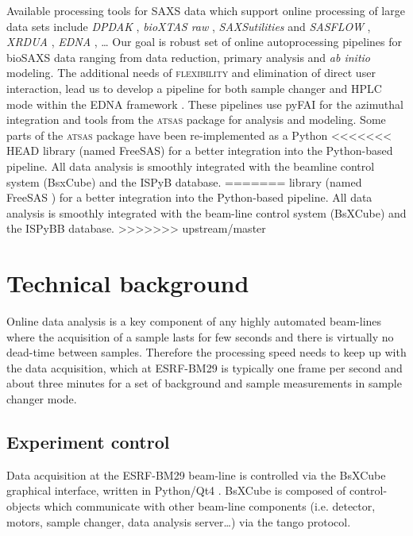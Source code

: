\documentclass[preprint,pdf]{iucr}              %
\begin{document}
Available processing tools for SAXS data which support online processing of
large data sets include \textit{DPDAK} \cite{DPDAK}, \textit{bioXTAS raw}
\cite{BioXTASraw}, \textit{SAXSutilities} \cite{SAXSUtilities} and
\textit{SASFLOW} \cite{X33P,P12},  \textit{XRDUA} \cite{XRDUA}, \textit{EDNA}
, \ldots 
Our goal is robust set of online autoprocessing pipelines
for bioSAXS data ranging from data reduction, primary analysis and \textit{ab
initio} modeling.
The additional needs of \textsc{flexibility} and elimination of
direct user interaction, lead us to develop a pipeline for both sample changer and HPLC mode within the
EDNA framework \cite{edna}.
These pipelines use pyFAI for the azimuthal integration \cite{pyFAI} and tools
from the \textsc{atsas} package \cite{ATSAS1, ATSAS2} for analysis and modeling.
Some parts of the \textsc{atsas} package have been re-implemented as a Python
<<<<<<< HEAD
library (named FreeSAS) for a better integration into the Python-based pipeline. 
All data analysis is smoothly integrated with the beamline control system
(BsxCube) and the ISPyB database.
=======
library (named FreeSAS \cite{freesas}) for a better integration into the
Python-based pipeline.
All data analysis is smoothly integrated with the beam-line control system
(BsXCube) and the ISPyBB \cite{ISPYBB} database.
>>>>>>> upstream/master

\section{Technical background}

Online data analysis is a key component of any highly automated beam-lines
where the acquisition of a sample lasts for few seconds and there is
virtually no dead-time between samples.
Therefore the processing speed needs to keep up with the data acquisition, which
at ESRF-BM29 is typically one frame per second and about three minutes for a set
of background and sample measurements in sample changer mode.


\subsection{Experiment control}
Data acquisition at the ESRF-BM29 beam-line is controlled via the BsXCube
graphical interface, written in Python/Qt4 \cite{pyqt}.
BsXCube is composed of control-objects which communicate with other beam-line
components (i.e. detector, motors, sample changer, data analysis server\ldots)
via the tango protocol\cite{tango}.
\end{document}

